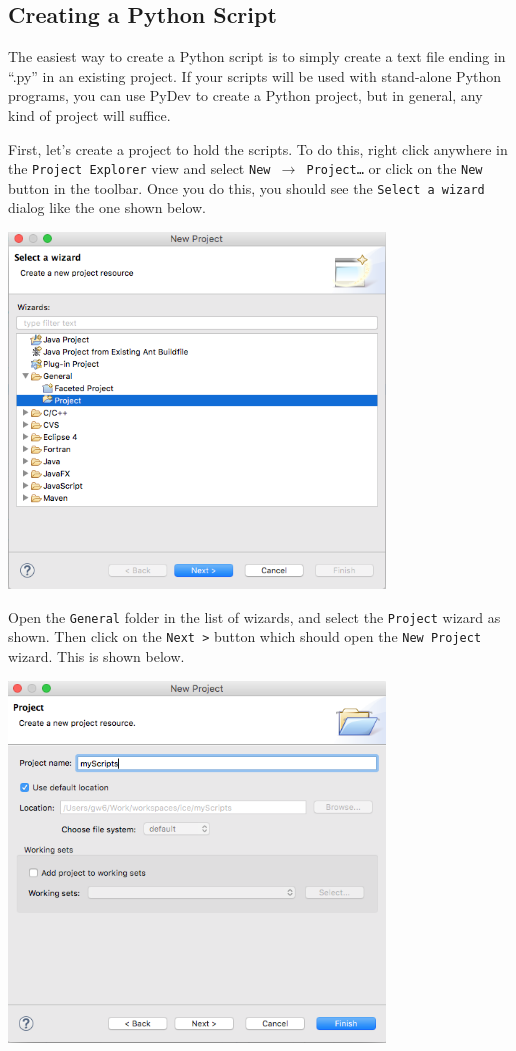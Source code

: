 \documentclass{article}
\begin{document}
\subsection{Creating a Python Script}

The easiest way to create a Python script is to simply create a text file ending
in ``.py'' in an existing project. If your scripts will be used with stand-alone Python
programs, you can use PyDev to create a Python project, but in general, any kind
of project will suffice.

First, let's create a project to hold the scripts. To do this, right click
anywhere in the \texttt{Project Explorer} view and select \texttt{New
$\rightarrow$ Project\ldots} or click on the \texttt{New} button in the toolbar. Once you do
this, you should see the \texttt{Select a wizard} dialog like the one shown below.

\begin{center}
\includegraphics[width=10cm]{images/newproject}
\end{center}

Open the \texttt{General} folder in the list of wizards, and select the \texttt{Project}
wizard as shown. Then click on the \texttt{Next \textgreater} button which
should open the \texttt{New Project} wizard. This is shown below.

\begin{center}
\includegraphics[width=10cm]{images/newproject_wiz}
\end{center}
\end{document}
